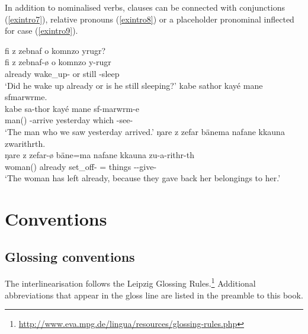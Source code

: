 In addition to nominalised verbs, clauses can be connected with conjunctions (\ref{exintro7}), relative pronouns (\ref{exintro8}) or a placeholder pronominal inflected for case (\ref{exintro9}).

\ea \label{exintro7}
    fi z zebnaf o komnzo yrugr?\\
    \gll fi z zebnaf-ø o komnzo y-rugr\\
	 already wake\_up- or still -sleep\\
	\glt `Did he wake up already or is he still sleeping?'
\z
\ea \label{exintro8}
    kabe sathor kayé mane sfmarwrme.\\
    \gll kabe sa-thor kayé mane sf-marwrm-e\\
	man() -arrive yesterday which -see-\\
	\glt `The man who we saw yesterday arrived.'
\z
\newpage
\ea \label{exintro9}
    ŋare z zefar bänema nafane kkauna zwarithrth.\\
	\gll ŋare z zefar-ø bäne=ma nafane kkauna zu-a-rithr-th\\
	woman() already set\_off- =  things --give-\\
	\glt `The woman has left already, because they gave back her belongings to her.'
\z

\section{Conventions}\label{sec:conventions}
\subsection{Glossing conventions}

The interlinearisation follows the Leipzig Glossing Rules.\footnote{\url{http://www.eva.mpg.de/lingua/resources/glossing-rules.php}} Additional abbreviations that appear in the gloss line are listed in the preamble to this book.


